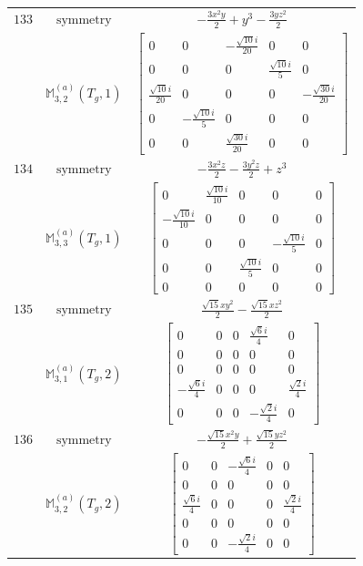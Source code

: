 \documentclass[fleqn,8pt,landscape]{jsarticle}
\begin{document}
\begin{longtable}{ccc}
$ 133 $ & $ \text{symmetry} $ & $ - \frac{3 x^{2} y}{2} + y^{3} - \frac{3 y z^{2}}{2} $ \\
$  $ & $ \mathbb{M}_{3,2}^{(a)}(T_{g},1) $ & $ \begin{bmatrix} 0 & 0 & - \frac{\sqrt{10} i}{20} & 0 & 0 \\ 0 & 0 & 0 & \frac{\sqrt{10} i}{5} & 0 \\ \frac{\sqrt{10} i}{20} & 0 & 0 & 0 & - \frac{\sqrt{30} i}{20} \\ 0 & - \frac{\sqrt{10} i}{5} & 0 & 0 & 0 \\ 0 & 0 & \frac{\sqrt{30} i}{20} & 0 & 0 \end{bmatrix} $ \\ \hline
$ 134 $ & $ \text{symmetry} $ & $ - \frac{3 x^{2} z}{2} - \frac{3 y^{2} z}{2} + z^{3} $ \\
$  $ & $ \mathbb{M}_{3,3}^{(a)}(T_{g},1) $ & $ \begin{bmatrix} 0 & \frac{\sqrt{10} i}{10} & 0 & 0 & 0 \\ - \frac{\sqrt{10} i}{10} & 0 & 0 & 0 & 0 \\ 0 & 0 & 0 & - \frac{\sqrt{10} i}{5} & 0 \\ 0 & 0 & \frac{\sqrt{10} i}{5} & 0 & 0 \\ 0 & 0 & 0 & 0 & 0 \end{bmatrix} $ \\ \hline
$ 135 $ & $ \text{symmetry} $ & $ \frac{\sqrt{15} x y^{2}}{2} - \frac{\sqrt{15} x z^{2}}{2} $ \\
$  $ & $ \mathbb{M}_{3,1}^{(a)}(T_{g},2) $ & $ \begin{bmatrix} 0 & 0 & 0 & \frac{\sqrt{6} i}{4} & 0 \\ 0 & 0 & 0 & 0 & 0 \\ 0 & 0 & 0 & 0 & 0 \\ - \frac{\sqrt{6} i}{4} & 0 & 0 & 0 & \frac{\sqrt{2} i}{4} \\ 0 & 0 & 0 & - \frac{\sqrt{2} i}{4} & 0 \end{bmatrix} $ \\ \hline
$ 136 $ & $ \text{symmetry} $ & $ - \frac{\sqrt{15} x^{2} y}{2} + \frac{\sqrt{15} y z^{2}}{2} $ \\
$  $ & $ \mathbb{M}_{3,2}^{(a)}(T_{g},2) $ & $ \begin{bmatrix} 0 & 0 & - \frac{\sqrt{6} i}{4} & 0 & 0 \\ 0 & 0 & 0 & 0 & 0 \\ \frac{\sqrt{6} i}{4} & 0 & 0 & 0 & \frac{\sqrt{2} i}{4} \\ 0 & 0 & 0 & 0 & 0 \\ 0 & 0 & - \frac{\sqrt{2} i}{4} & 0 & 0 \end{bmatrix} $ \\ \hline

\end{longtable}
\end{document}
